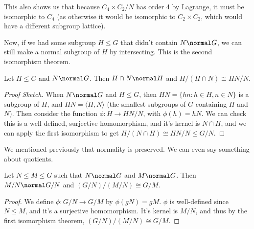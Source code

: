 \documentclass[a4]{scrreprt}
\begin{document}
\begin{example}
\begin{center}


	\end{center}
	This also shows us that because $C_4 \times C_2 / N$ has order 4 by Lagrange, it must be isomorphic to $C_4$ (as otherwise it would be isomorphic to $C_2 \times C_2$, which would have a different subgroup lattice).
\end{example}

Now, if we had some subgroup $H \leq G$ that didn't contain $N \normal G$, we can still make a normal subgroup of $H$ by intersecting. This is the second isomorphism theorem.

\begin{theorem}
	Let $H \leq G$ and $N \normal G$. Then $H \cap N \normal H$ and $H/(H \cap N) \cong HN / N$.
\end{theorem}
\begin{proof}[Proof Sketch]
	When $N \normal G$ and $H \leq G$, then $HN = \{ hn : h \in H, n \in N\}$ is a subgroup of $H$, and $HN = \langle H, N \rangle$ (the smallest subgroups of $G$ containing $H$ and $N$). Then consider the function $\phi : H \rightarrow HN/N$, with $\phi(h) = hN$. We can check this is a well defined, surjective homomorphism, and it's kernel is $N \cap H$, and we can apply the first isomorphism to get $H/(N \cap H) \cong HN/N \leq G/N$.
\end{proof}

We mentioned previously that normality is preserved. We can even say something about quotients.

\begin{theorem}
	Let $N \leq M \leq G$ such that $N \normal G$ and $M \normal G$. Then $M/N \normal G/N$ and $(G/N) / (M/N) \cong G/M$.
\end{theorem}
\begin{proof}
	We define $\phi: G/N \rightarrow G/M$ by $\phi(gN) = gM$. $\phi$ is well-defined since $N \leq M$, and it's a surjective homomorphism. It's kernel is $M/N$, and thus by the first isomorphism theorem, $(G/N) / (M/N) \cong G/M$.
\end{proof}
\end{document}
